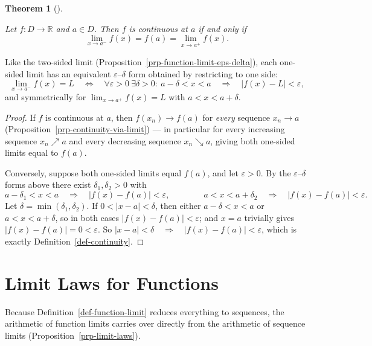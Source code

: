 \documentclass[
  letterpaper,
  DIV=11,
  numbers=noendperiod]{scrreprt}
\theoremstyle{plain}
\theoremstyle{plain}
\theoremstyle{definition}
\theoremstyle{definition}
\theoremstyle{definition}
\theoremstyle{plain}
\newtheorem{theorem}{Theorem}[chapter]
\theoremstyle{plain}
\theoremstyle{remark}
\begin{document}
\begin{theorem}[]\protect\hypertarget{thm-continuity-one-sided}{}\label{thm-continuity-one-sided}

\hfill\break
Let \(f\colon D\to\mathbb{R}\) and \(a\in D\). Then \(f\) is continuous
at \(a\) if and only if \[
\lim_{x\to a^-} f(x) = f(a) = \lim_{x\to a^+} f(x).
\]

\end{theorem}

Like the two-sided limit
(Proposition~\ref{prp-function-limit-eps-delta}), each one-sided limit
has an equivalent \(\varepsilon\)--\(\delta\) form obtained by
restricting to one side: \[
\lim_{x\to a^-} f(x) = L \quad \Leftrightarrow \quad\forall\varepsilon>0\ \exists\delta>0:\ a-\delta<x<a \quad \Rightarrow \quad\lvert f(x)-L \rvert<\varepsilon,
\] and symmetrically for \(\lim_{x\to a^+}f(x)=L\) with
\(a<x<a+\delta\).

\begin{proof}
If \(f\) is continuous at \(a\), then \(f(x_n)\to f(a)\) for
\emph{every} sequence \(x_n\to a\)
(Proposition~\ref{prp-continuity-via-limit}) --- in particular for every
increasing sequence \(x_n\nearrow a\) and every decreasing sequence
\(x_n\searrow a\), giving both one-sided limits equal to \(f(a)\).

Conversely, suppose both one-sided limits equal \(f(a)\), and let
\(\varepsilon>0\). By the \(\varepsilon\)--\(\delta\) forms above there
exist \(\delta_1,\delta_2>0\) with \[
a-\delta_1<x<a \quad \Rightarrow \quad\lvert f(x)-f(a) \rvert<\varepsilon, \qquad\qquad a<x<a+\delta_2 \quad \Rightarrow \quad\lvert f(x)-f(a) \rvert<\varepsilon.
\] Let \(\delta=\min(\delta_1,\delta_2)\). If
\(0<\lvert x-a \rvert<\delta\), then either \(a-\delta<x<a\) or
\(a<x<a+\delta\), so in both cases
\(\lvert f(x)-f(a) \rvert<\varepsilon\); and \(x=a\) trivially gives
\(\lvert f(x)-f(a) \rvert=0<\varepsilon\). So
\(\lvert x-a \rvert<\delta \quad \Rightarrow \quad\lvert f(x)-f(a) \rvert<\varepsilon\),
which is exactly Definition~\ref{def-continuity}.
\end{proof}

\section{Limit Laws for Functions}\label{limit-laws-for-functions}

Because Definition~\ref{def-function-limit} reduces everything to
sequences, the arithmetic of function limits carries over directly from
the arithmetic of sequence limits (Proposition~\ref{prp-limit-laws}).
\end{document}
